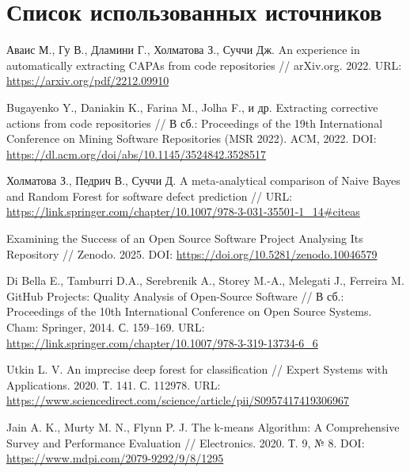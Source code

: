 \chapter*{Список использованных источников}

\begin{thebibliography}{99}
	
	\label{Awais2022}
	Аваис М., Гу В., Дламини Г., Холматова З., Суччи Дж.  
	An experience in automatically extracting CAPAs from code repositories // arXiv.org. 2022.  
	URL: \url{https://arxiv.org/pdf/2212.09910}
	
	\label{Bugayenko2022}
	Bugayenko Y., Daniakin K., Farina M., Jolha F., и др.  
	Extracting corrective actions from code repositories //  
	В сб.: Proceedings of the 19th International Conference on Mining Software Repositories (MSR 2022). ACM, 2022.  
	DOI: \url{https://dl.acm.org/doi/abs/10.1145/3524842.3528517}
	
	\label{Holmatova2021}
	Холматова З., Педрич В., Суччи Д.  
	A meta-analytical comparison of Naive Bayes and Random Forest for software defect prediction // 
	URL: \url{https://link.springer.com/chapter/10.1007/978-3-031-35501-1_14#citeas}
	
	\label{Zenodo2025}
	Examining the Success of an Open Source Software Project Analysing Its Repository //  
	Zenodo. 2025.  
	DOI: \url{https://doi.org/10.5281/zenodo.10046579}
	
	\label{DiBella2014}
	Di Bella E., Tamburri D.A., Serebrenik A., Storey M.-A., Melegati J., Ferreira M.  
	GitHub Projects: Quality Analysis of Open-Source Software //  
	В сб.: Proceedings of the 10th International Conference on Open Source Systems.  
	Cham: Springer, 2014. С. 159–169.  
	URL: \url{https://link.springer.com/chapter/10.1007/978-3-319-13734-6_6}
	
	\label{Utkin2020}
	Utkin L. V.  
	An imprecise deep forest for classification // Expert Systems with Applications.  
	2020. Т. 141. С. 112978.  
	URL: \url{https://www.sciencedirect.com/science/article/pii/S0957417419306967}
	
	\label{Jain2020}
	Jain A. K., Murty M. N., Flynn P. J.  
	The k-means Algorithm: A Comprehensive Survey and Performance Evaluation //  
	Electronics. 2020. Т. 9, № 8.  
	DOI: \url{https://www.mdpi.com/2079-9292/9/8/1295}
	

\end{thebibliography}
